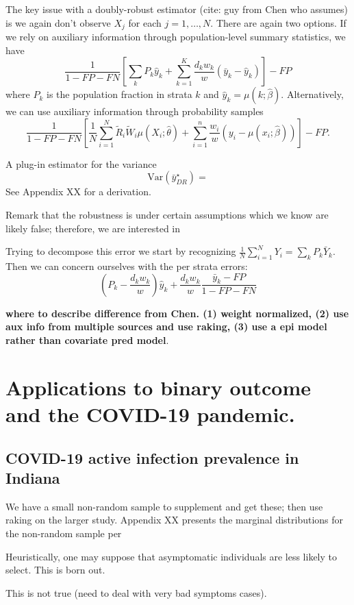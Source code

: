 \documentclass[11pt]{amsart}
\begin{document}
The key issue with a doubly-robust estimator (cite: guy from Chen who assumes) is we again don't observe $X_j$ for each $j=1,\ldots,N$. There are again two options.  If we rely on auxiliary information through population-level summary statistics, we have
$$
\frac{1}{1 - FP - FN} \left[ \sum_{k} P_k \hat y_k + \sum_{k=1}^K \frac{d_k w_k}{w} (\bar y_k - \hat y_k) \right] - FP
$$
where $P_k$ is the population fraction in strata $k$ and $\hat y_k = \mu(k; \hat \beta)$. Alternatively, we can use auxiliary information through probability samples
$$
\frac{1}{1-FP-FN} \left[ \frac{1}{N} \sum_{i=1}^N \tilde R_i \tilde W_i \mu (X_i; \hat \theta) + \sum_{i=1}^n \frac{w_i}{w} \left(y_i - \mu(x_i; \hat \beta)\right) \right] - FP.
$$

A plug-in estimator for the variance
$$
\text{Var} (\bar y_{DR}^\star) =
$$
See Appendix XX for a derivation.

Remark that the robustness is under certain assumptions which we know are likely false; therefore, we are interested in

Trying to decompose this error we start by recognizing $\frac{1}{N} \sum_{i=1}^N Y_i = \sum_k P_k \bar Y_k$.  Then we can concern ourselves with the per strata errors:
$$
\left( P_k - \frac{d_k w_k}{w} \right) \hat y_k + \frac{d_k w_k}{w} \frac{\bar y_k - FP}{1-FP-FN}
$$

{\bf where to describe difference from Chen. (1) weight normalized, (2) use aux info from multiple sources and use raking, (3) use a epi model rather than covariate pred model}.

\section{Applications to binary outcome and the COVID-19 pandemic.}
\label{section:applications}

\subsection{COVID-19 active infection prevalence in Indiana}

We have a small non-random sample to supplement and get these; then use raking on the larger study.  Appendix XX presents the marginal distributions for the non-random sample per

Heuristically, one may suppose that asymptomatic individuals are less likely to select.  This is born out.

This is not true (need to deal with very bad symptoms cases).
\end{document}
